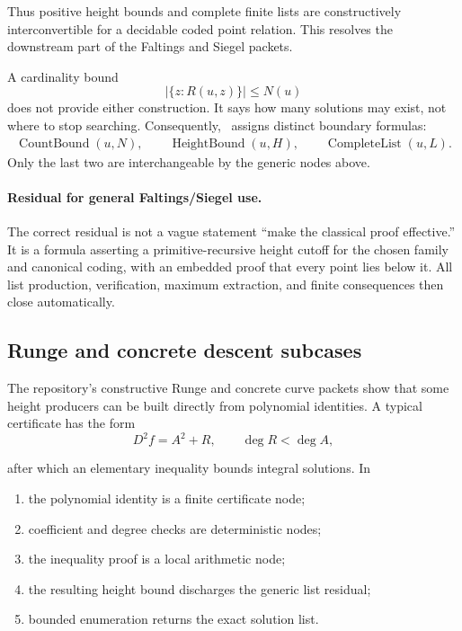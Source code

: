 Thus positive height bounds and complete finite lists are constructively interconvertible for a decidable coded point relation.  This resolves the downstream part of the Faltings and Siegel packets.

A cardinality bound
\[
 |\{z:R(u,z)\}|\le N(u)
\]
does not provide either construction.  It says how many solutions may exist, not where to stop searching.  Consequently, \CIFER\ assigns distinct boundary formulas:
\begin{align*}
 \operatorname{CountBound}(u,N),\qquad
 \operatorname{HeightBound}(u,H),\qquad
 \operatorname{CompleteList}(u,L).
\end{align*}
Only the last two are interchangeable by the generic nodes above.

\paragraph{Residual for general Faltings/Siegel use.}
The correct residual is not a vague statement ``make the classical proof effective.''  It is a formula asserting a primitive-recursive height cutoff for the chosen family and canonical coding, with an embedded proof that every point lies below it.  All list production, verification, maximum extraction, and finite consequences then close automatically.

\subsection{Runge and concrete descent subcases}

The repository's constructive Runge and concrete curve packets show that some height producers can be built directly from polynomial identities.  A typical certificate has the form
\[
 D^2f=A^2+R,
 \qquad \deg R<\deg A,
\]

after which an elementary inequality bounds integral solutions.  In \CIFER\:

\begin{enumerate}
\item the polynomial identity is a finite certificate node;
\item coefficient and degree checks are deterministic nodes;
\item the inequality proof is a local arithmetic node;
\item the resulting height bound discharges the generic list residual;
\item bounded enumeration returns the exact solution list.
\end{enumerate}

